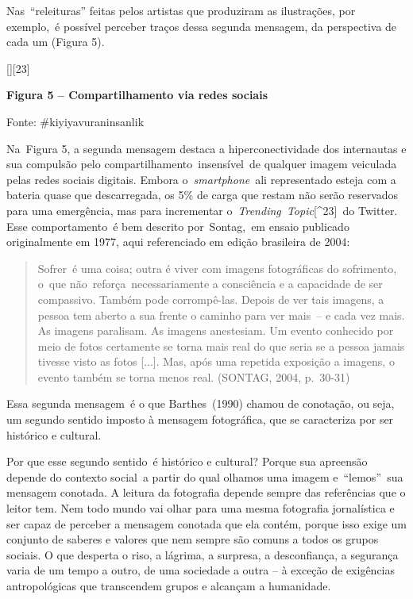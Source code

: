 \documentclass[
  letterpaper,
]{scrbook}
\begin{document}
Nas~``releituras'' feitas pelos artistas que produziram as ilustrações,
por exemplo,~é possível perceber traços dessa segunda mensagem, da
perspectiva de cada um (Figura 5). ~

{[}{]}{[}23{]}~

\protect\hypertarget{_Ref503520168}{}{}\textbf{Figura 5 --
Compartilhamento via redes sociais}

Fonte: \#kiyiyavuraninsanlik~ ~

Na~Figura 5, a segunda mensagem destaca a hiperconectividade dos
internautas e sua compulsão pelo compartilhamento~insensível~de qualquer
imagem veiculada pelas redes sociais digitais. Embora
o~\emph{smartphone}~ali representado esteja com a bateria quase que
descarregada, os 5\% de carga que restam não serão reservados para uma
emergência, mas para incrementar o~\emph{Trending~Topic}{[}\^{}23{]}~do
Twitter. Esse comportamento~é bem descrito por~Sontag,~em ensaio
publicado originalmente em 1977, aqui referenciado em edição brasileira
de 2004:~ ~

\begin{quote}
Sofrer~é uma coisa; outra é viver com imagens fotográficas do
sofrimento, o~que não~reforça~necessariamente a consciência e a
capacidade de ser compassivo. Também pode corrompê-las. Depois de ver
tais imagens, a pessoa tem aberto a sua frente o caminho para ver
mais~-- e cada vez mais. As imagens paralisam. As imagens anestesiam. Um
evento conhecido por meio de fotos certamente se torna mais real do que
seria se a pessoa jamais tivesse visto as fotos {[}...{]}. Mas, após uma
repetida exposição a imagens, o evento também se torna menos real.
(SONTAG, 2004, p.~30-31)~ ~
\end{quote}

Essa segunda mensagem~é o que Barthes~(1990) chamou de conotação, ou
seja, um segundo sentido imposto à mensagem fotográfica, que se
caracteriza por ser histórico e cultural.~

Por que esse segundo sentido~é histórico e cultural? Porque sua
apreensão depende do contexto social~a partir do qual olhamos uma imagem
e~``lemos''\emph{~}sua mensagem conotada. A leitura da fotografia
depende sempre das referências que o leitor tem. Nem todo mundo vai
olhar para uma mesma fotografia jornalística e ser capaz de perceber a
mensagem conotada que ela contém, porque isso exige um conjunto de
saberes e valores que nem sempre são comuns a todos os grupos sociais. O
que desperta o riso, a lágrima, a surpresa, a desconfiança, a segurança
varia de um tempo a outro, de uma sociedade a outra -- à exceção de
exigências antropológicas que transcendem grupos e alcançam a
humanidade.~
\end{document}
